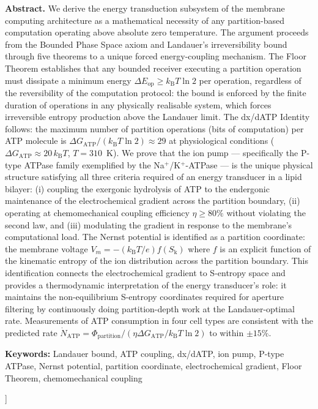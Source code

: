 \documentclass[11pt,twocolumn,a4paper]{article}
\theoremstyle{definition}
\theoremstyle{remark}
\newcommand{\kB}{k_{\mathrm{B}}}
\newcommand{\Sk}{S_{\mathrm{k}}}
\begin{document}
\begin{@twocolumnfalse}
\begin{center}
\begin{minipage}{0.92\textwidth}
\textbf{Abstract.}
We derive the energy transduction subsystem of the membrane computing architecture
as a mathematical necessity of any partition-based computation operating above
absolute zero temperature. The argument proceeds from the Bounded Phase Space
axiom and Landauer's irreversibility bound through five theorems to a unique
forced energy-coupling mechanism. The Floor Theorem establishes that any
bounded receiver executing a partition operation must dissipate a minimum
energy $\Delta E_{\mathrm{op}} \geq \kB T \ln 2$ per operation, regardless of the
reversibility of the computation protocol: the bound is enforced by the finite
duration of operations in any physically realisable system, which forces
irreversible entropy production above the Landauer limit. The dx/dATP Identity
follows: the maximum number of partition operations (bits of computation) per
ATP molecule is $\Delta G_{\mathrm{ATP}} / (\kB T \ln 2) \approx 29$ at
physiological conditions ($\Delta G_{\mathrm{ATP}} \approx 20\,\kB T$,
$T = 310$~K). We prove that the ion pump --- specifically the P-type ATPase
family exemplified by the Na$^+$/K$^+$-ATPase --- is the unique physical
structure satisfying all three criteria required of an energy transducer in
a lipid bilayer: (i) coupling the exergonic hydrolysis of ATP to the endergonic
maintenance of the electrochemical gradient across the partition boundary,
(ii) operating at chemomechanical coupling efficiency $\eta \geq 80\%$ without
violating the second law, and (iii) modulating the gradient in response to
the membrane's computational load. The Nernst potential is identified as a
partition coordinate: the membrane voltage $V_m = -(\kB T / e) f(\Sk)$
where $f$ is an explicit function of the kinematic entropy of the ion distribution
across the partition boundary. This identification connects the electrochemical
gradient to S-entropy space and provides a thermodynamic interpretation of the
energy transducer's role: it maintains the non-equilibrium S-entropy coordinates
required for aperture filtering by continuously doing partition-depth work at the
Landauer-optimal rate. Measurements of ATP consumption in four cell types are
consistent with the predicted rate $\dot{N}_{\mathrm{ATP}} = \Phi_{\mathrm{partition}} /
(\eta \Delta G_{\mathrm{ATP}} / \kB T \ln 2)$ to within $\pm 15\%$.
\end{minipage}

\vspace{8pt}
\noindent\textbf{Keywords:}
Landauer bound, ATP coupling, dx/dATP, ion pump, P-type ATPase, Nernst potential,
partition coordinate, electrochemical gradient, Floor Theorem, chemomechanical coupling

\vspace{18pt}
\end{center}
\end{@twocolumnfalse}
]
\end{document}
